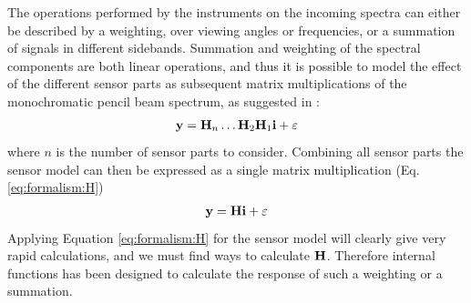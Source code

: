 The operations performed by the instruments on the incoming spectra can either be described by a weighting, over viewing angles or frequencies, or a summation of signals in different sidebands.
Summation and weighting of the spectral components are both linear
operations, and thus it is possible to model the effect of the
different sensor parts as subsequent matrix multiplications of the
monochromatic pencil beam spectrum, as suggested in \citet{eriksson:00a}:
\begin{eqnarray}
  \mathbf{y} = \mathbf{H}_{n}\dots\mathbf{H}_{2}\mathbf{H}_{1}\mathbf{i} + \varepsilon
\end{eqnarray}
where $n$ is the number of sensor parts to consider. Combining all sensor parts 
the sensor model can then be expressed as a single matrix
multiplication (Eq. \ref{eq:formalism:H})
\begin{eqnarray}
  \mathbf{y} = \mathbf{H}\mathbf{i} + \varepsilon                     \nonumber
\end{eqnarray}
Applying Equation \ref{eq:formalism:H} for the sensor model will
clearly give very rapid calculations, and we must find ways to
calculate $\mathbf{H}$. Therefore internal functions has been designed to calculate the response of such a weighting or a summation.


